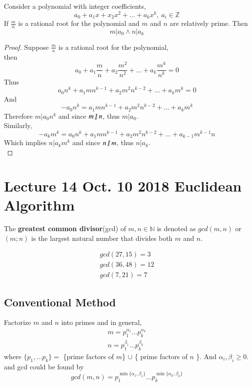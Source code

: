 \documentclass[11pt]{article}
\begin{document}
	\begin{theorem}
		Consider a polynomial with integer coefficients, 
		\[
			a_0 + a_1 x + x_2 x^2 + \dots + a_k x^k,\ a_i \in \mathbb{Z}
		\]
		If $\frac{m}{n}$ is a rational root for the polynomial and $m$ and $n$ are relatively prime. Then
		\[
			m | a_0 \land n | a_k
		\]
	\end{theorem}
	\begin{proof}
		Suppose $\frac{m}{n}$ is a rational root for the polynomial, \\
		then 
		\[
			a_0 + a_1 \frac{m}{n} + a_2 \frac{m^2}{n^2} + \dots + a_k \frac{m^k}{n^k} = 0
		\]
		Thus 
		\[
			a_0 n^k + a_1 m n^{k-1} + a_2 m^2 n^{k-2} + \dots + a_k m^k = 0
		\]
		And 
		\[
			- a_0 n^k = a_1 m n^{k-1} + a_2 m^2 n^{k-2} + \dots + a_k m^k
		\]
		Therefore $m | a_0 n^k$ and since $m \centernot | n$, thus $m | a_0$. \\
		Similarly,
		\[
			- a_k m^k = a_0 n^k + a_1 m n^{k-1} + a_2 m^2 n^{k-2} + \dots + a_{k-1}m^{k-1}n
		\]
		Which implies $n | a_k m^k$ and since $n \centernot | m$, thus $n | a_k$. \\
	\end{proof}
	
	\section{Lecture 14 Oct. 10 2018 Euclidean Algorithm}
		\begin{definition}
			The \textbf{greatest common divisor}(gcd) of $m, n \in \mathbb{N}$ is denoted as $gcd(m,n)$ or $(m;n)$ is the largest natural number that divides both $m$ and $n$.
		\end{definition}
		\begin{example}
			\begin{gather*}
				gcd(27, 15) = 3 \\
				gcd(36, 48) = 12 \\
				gcd(7, 21) = 7
			\end{gather*}
		\end{example}
		\subsection{Conventional Method}
		\par Factorize $m$ and $n$ into primes and in general,
		\begin{gather*}
			m = p_1^{\alpha_1} \dots p_k^{\alpha_k} \\
			n = p_1^{\beta_1} \dots p_k^{\beta_k}
		\end{gather*}
		where $\{p_1, \dots p_k \} = $ \{prime factors of $m$\} $\cup$ \{ prime factors of $n$ \}. And $\alpha_i, \beta_i \geq 0$.
		and gcd could be found by
		\[
			gcd(m,n) = p_1^{\min\{\alpha_1, \beta_1\}} \dots p_k^{\min\{\alpha_k, \beta_k\}}
		\]
		
\end{document}
